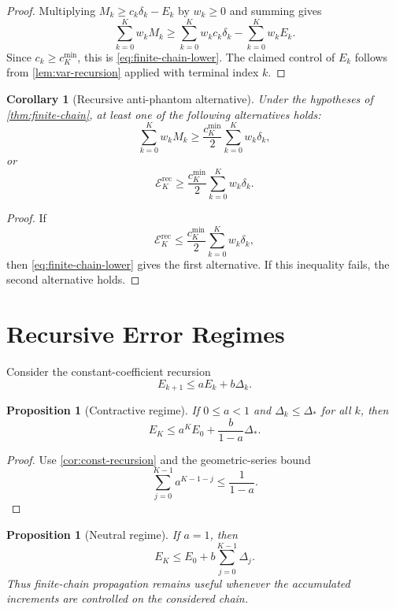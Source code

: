 \documentclass[11pt]{article}
\numberwithin{equation}{section}
\theoremstyle{plain}
\newtheorem{proposition}[theorem]{Proposition}
\newtheorem{corollary}[theorem]{Corollary}
\theoremstyle{definition}
\theoremstyle{remark}
\begin{document}
\begin{proof}
Multiplying \(M_k\ge c_k\delta_k-E_k\) by \(w_k\ge0\) and summing gives
\[
  \sum_{k=0}^K w_kM_k
  \ge
  \sum_{k=0}^K w_kc_k\delta_k
  -
  \sum_{k=0}^K w_kE_k.
\]
Since \(c_k\ge c_K^{\min}\), this is \eqref{eq:finite-chain-lower}.  The
claimed control of \(E_k\) follows from \cref{lem:var-recursion} applied with
terminal index \(k\).
\end{proof}

\begin{corollary}[Recursive anti-phantom alternative]\label{cor:recursive-alt}
Under the hypotheses of \cref{thm:finite-chain}, at least one of the
following alternatives holds:
\[
  \sum_{k=0}^K w_kM_k
  \ge
  \frac{c_K^{\min}}{2}
  \sum_{k=0}^K w_k\delta_k,
\]
or
\[
  \mathcal E_K^{\mathrm{rec}}
  \ge
  \frac{c_K^{\min}}{2}
  \sum_{k=0}^K w_k\delta_k.
\]
\end{corollary}

\begin{proof}
If
\[
  \mathcal E_K^{\mathrm{rec}}
  \le
  \frac{c_K^{\min}}{2}\sum_{k=0}^K w_k\delta_k,
\]
then \eqref{eq:finite-chain-lower} gives the first alternative.  If this
inequality fails, the second alternative holds.
\end{proof}


\section{Recursive Error Regimes}

Consider the constant-coefficient recursion
\[
  E_{k+1}\le aE_k+b\Delta_k.
\]

\begin{proposition}[Contractive regime]\label{prop:contractive}
If \(0\le a<1\) and \(\Delta_k\le \Delta_*\) for all \(k\), then
\[
  E_K
  \le
  a^K E_0+\frac{b}{1-a}\Delta_*.
\]
\end{proposition}

\begin{proof}
Use \cref{cor:const-recursion} and the geometric-series bound
\[
  \sum_{j=0}^{K-1}a^{K-1-j}\le \frac{1}{1-a}.
\]
\end{proof}

\begin{proposition}[Neutral regime]\label{prop:neutral}
If \(a=1\), then
\[
  E_K\le E_0+b\sum_{j=0}^{K-1}\Delta_j.
\]
Thus finite-chain propagation remains useful whenever the accumulated
increments are controlled on the considered chain.
\end{proposition}
\end{document}
